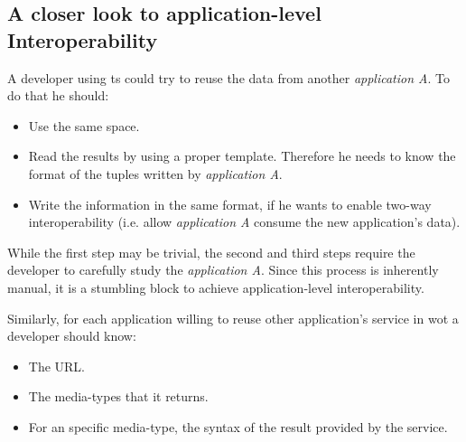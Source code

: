 \subsection{A closer look to application-level Interoperability}
\label{sec:closer}

A developer using \ac{ts} could try to reuse the data from another \emph{application A}.
To do that he should:
\begin{itemize}
 \item Use the same space.%
 \item Read the results by using a proper template.
	Therefore he needs to know the format of the tuples written by \emph{application A}.
 \item Write the information in the same format, if he wants to enable two-way interoperability
      (i.e. allow \emph{application A} consume the new application's data).

\end{itemize}

While the first step may be trivial, the second and third steps require the developer to carefully study the \emph{application A}.
Since this process is inherently manual, it is a stumbling block to achieve application-level interoperability.

\medskip

Similarly, for each application willing to reuse other application's service in \ac{wot} a developer should know:
\begin{itemize}
 \item The URL.
 \item The media-types that it returns.
 \item For an specific media-type, the syntax of the result provided by the service. %
\end{itemize}

